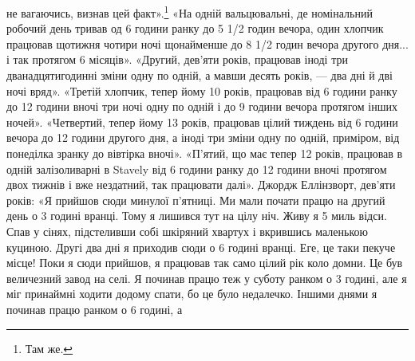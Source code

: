 \parcont{}  %
не вагаючись, визнав цей факт».\footnote{
Там же.
} «На одній вальцювальні, де
номінальний робочий день тривав од 6 години ранку до 5 1/2  годин
вечора, один хлопчик працював щотижня чотири ночі щонайменше
до 8 1/2 годин вечора другого дня... і так протягом
6 місяців». «Другий, дев’яти років, працював іноді три дванадцятигодинні
зміни одну по одній, а мавши десять років, — два дні й
дві ночі вряд». «Третій хлопчик, тепер йому 10 років, працював
від 6 години ранку до 12 години вночі три ночі одну по одній і
до 9 години вечора протягом інших ночей». «Четвертий, тепер
йому 13 років, працював цілий тиждень від 6 години вечора до
12 години другого дня, а іноді три зміни одну по одній, приміром,
від понеділка зранку до вівтірка вночі». «П’ятий, що має тепер
12 років, працював в одній залізоливарні в Stavely від 6 години
ранку до 12 години вночі протягом двох тижнів і вже нездатний,
так працювати далі». Джордж Еллінзворт, дев’яти років: «Я прийшов
сюди минулої п’ятниці. Ми мали почати працю на другий
день о 3 годині вранці. Тому я лишився тут на цілу ніч. Живу я
5 миль відси. Спав у сінях, підстеливши собі шкіряний хвартух
і вкрившись маленькою куциною. Другі два дні я приходив сюди
о 6 годині вранці. Еге, це таки пекуче місце! Поки я сюди прийшов,
я працював так само цілий рік коло домни. Це був величезний
завод на селі. Я починав працю теж у суботу ранком о 3 годині, але я міг принаймні ходити додому
спати, бо це було
недалечко. Іншими днями я починав працю ранком о 6 годині, а
